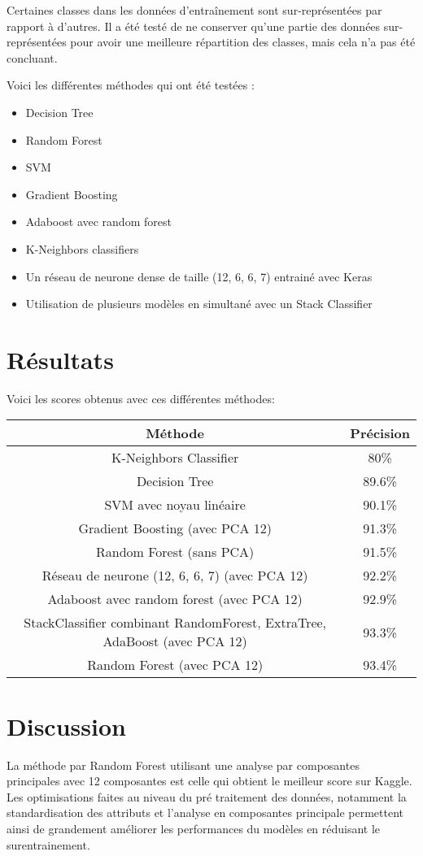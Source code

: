 \documentclass[12pt]{article}
\begin{document}
Certaines classes dans les données d'entraînement sont sur-représentées par rapport à d'autres. Il a été testé de ne conserver qu'une partie des données sur-représentées pour avoir une meilleure répartition des classes, mais cela n'a pas été concluant. 

Voici les différentes méthodes qui ont été testées :

\begin{itemize}
	\item Decision Tree
	\item Random Forest
	\item SVM
	\item Gradient Boosting
	\item Adaboost avec random forest
	\item K-Neighbors classifiers
	\item Un réseau de neurone dense de taille (12, 6, 6, 7) entrainé avec Keras
	\item Utilisation de plusieurs modèles en simultané avec un Stack Classifier
	
\end{itemize}


\section*{Résultats}

Voici les scores obtenus avec ces différentes méthodes:
\begin{center}
	\begin{tabular}{ |c|c| }
		\hline
		Méthode & Précision \\\hline\hline
	  K-Neighbors Classifier & 80\% \\\hline
		Decision Tree & 89.6\% \\\hline
		SVM avec noyau linéaire & 90.1\% \\\hline
		Gradient Boosting (avec PCA 12) & 91.3\% \\\hline
		Random Forest (sans PCA) & 91.5\% \\\hline
		Réseau de neurone (12, 6, 6, 7) (avec PCA 12) & 92.2\% \\\hline
		Adaboost avec random forest (avec PCA 12) & 92.9\% \\\hline
		StackClassifier combinant RandomForest, ExtraTree, AdaBoost (avec PCA 12) & 93.3\% \\\hline
		Random Forest (avec PCA 12) & 93.4\% \\\hline

	\end{tabular} 
\end{center}


\section*{Discussion}

La méthode par Random Forest utilisant une analyse par composantes principales avec 12 composantes est celle qui obtient le meilleur score sur Kaggle. Les optimisations faites au niveau du pré traitement des données, notamment la standardisation des attributs et l'analyse en composantes principale permettent ainsi de grandement améliorer les performances du modèles en réduisant le surentrainement.
\end{document}

